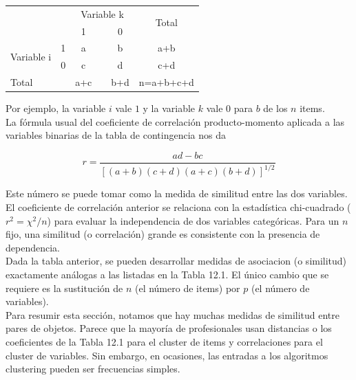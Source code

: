 \documentclass[a4paper, 20pt]{article}
\begin{document}
\begin{table}[]
\begin{tabular}{ll|clc|c|l}
\multicolumn{2}{l|}{\multirow{2}{*}{}} & \multicolumn{3}{c}{Variable k} & \multicolumn{2}{c|}{\multirow{2}{*}{Total}} \\
\multicolumn{2}{l|}{}                  & 1        &       & 0       & \multicolumn{2}{c|}{}                        \\ \hline
\multirow{2}{*}{Variable i}       & 1      & a        &       & b       & \multicolumn{2}{c|}{a+b}                     \\
                              & 0      & c        &       & d       & \multicolumn{2}{c|}{c+d}                     \\ \hline
\multicolumn{2}{l|}{Total}            & a+c      &       & b+d     & \multicolumn{2}{c|}{n=a+b+c+d}              
\end{tabular}
\end{table}

Por ejemplo, la variable $i$ vale $1$ y la variable $k$ vale $0$ para $b$ de los $n$ items.\\
La fórmula usual del coeficiente de correlación producto-momento aplicada a las variables binarias de la tabla de contingencia nos da

$$r = \frac{ad-bc}{[(a+b)(c+d)(a+c)(b+d)]^{1/2}}$$

Este número se puede tomar como la medida de similitud entre las dos variables.\\
El coeficiente de correlación anterior se relaciona con la estadística chi-cuadrado ($r^2=\chi^2/n$) para evaluar la independencia de dos variables categóricas. Para un $n$ fijo, una similitud (o correlación) grande es consistente con la presencia de dependencia.\\

Dada la tabla anterior, se pueden desarrollar medidas de asociacion (o similitud) exactamente análogas a las listadas en la Tabla 12.1. El único cambio que se requiere es la sustitución de $n$ (el número de items) por $p$ (el número de variables).\\

Para resumir esta sección, notamos que hay muchas medidas de similitud entre pares de objetos. Parece que la mayoría de profesionales usan distancias o los coeficientes de la Tabla 12.1 para el cluster de items y correlaciones para el cluster de variables. Sin embargo, en ocasiones, las entradas a los algoritmos clustering pueden ser frecuencias simples.\\
\end{document}
